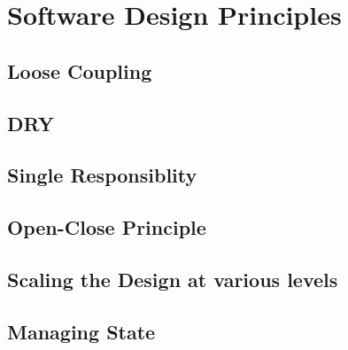 \section{Software Design Principles}
\subsection{Loose Coupling}
\subsection{DRY}
\subsection{Single Responsiblity}
\subsection{Open-Close Principle}
\subsection{Scaling the Design at various levels}
\subsection{Managing State}\label{managestate}
